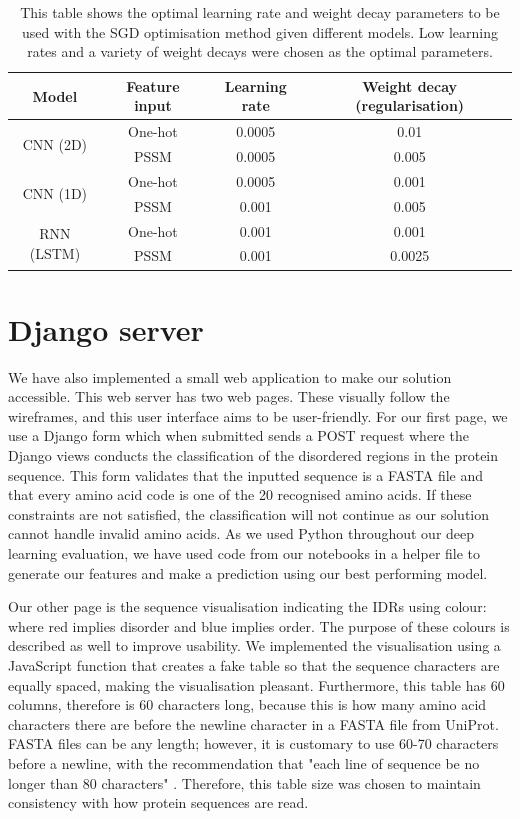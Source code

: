 \documentclass{l4proj}
\begin{document}
\begin{table}[!ht]
    \centering
    \caption{This table shows the optimal learning rate and weight decay parameters to be used with the SGD optimisation method given different models. Low learning rates and a variety of weight decays were chosen as the optimal parameters.}
    
    \begin{tabular}{@{}cccc@{}}
    \toprule
    Model & Feature input & Learning rate & Weight decay (regularisation) \\ \midrule
    \multirow{2}{*}{CNN (2D)} & One-hot & 0.0005 & 0.01 \\
     & PSSM & 0.0005 & 0.005 \\
    \multirow{2}{*}{CNN (1D)} & One-hot & 0.0005 & 0.001 \\
     & PSSM & 0.001 & 0.005 \\
    \multirow{2}{*}{RNN (LSTM)} & One-hot & 0.001 & 0.001 \\
     & PSSM & 0.001 & 0.0025 \\ \cmidrule(l){1-4} 
    \end{tabular}

    \label{tab:hyperparameters} 
\end{table}

\section{Django server}
We have also implemented a small web application to make our solution accessible. This web server has two web pages. These visually follow the wireframes, and this user interface aims to be user-friendly. For our first page, we use a Django form which when submitted sends a POST request where the Django views conducts the classification of the disordered regions in the protein sequence. This form validates that the inputted sequence is a FASTA file and that every amino acid code is one of the 20 recognised amino acids. If these constraints are not satisfied, the classification will not continue as our solution cannot handle invalid amino acids. As we used Python throughout our deep learning evaluation, we have used code from our notebooks in a helper file to generate our features and make a prediction using our best performing model.

Our other page is the sequence visualisation indicating the IDRs using colour: where red implies disorder and blue implies order. The purpose of these colours is described as well to improve usability. We implemented the visualisation using a JavaScript function that creates a fake table so that the sequence characters are equally spaced, making the visualisation pleasant. Furthermore, this table has 60 columns, therefore is 60 characters long, because this is how many amino acid characters there are before the newline character in a FASTA file from UniProt. FASTA files can be any length; however, it is customary to use 60-70 characters before a newline, with the recommendation that "each line of sequence be no longer than 80 characters" \citep{NCBI:88}. Therefore, this table size was chosen to maintain consistency with how protein sequences are read.
\end{document}
